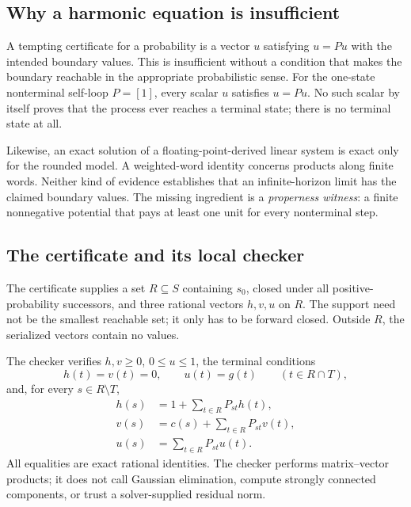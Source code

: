 \subsection{Why a harmonic equation is insufficient}
A tempting certificate for a probability is a vector $u$ satisfying $u=Pu$
with the intended boundary values. This is insufficient without a condition
that makes the boundary reachable in the appropriate probabilistic sense.
For the one-state nonterminal self-loop $P=[1]$, every scalar $u$ satisfies
$u=Pu$. No such scalar by itself proves that the process ever reaches a
terminal state; there is no terminal state at all.

Likewise, an exact solution of a floating-point-derived linear system is exact
only for the rounded model. A weighted-word identity concerns products along
finite words. Neither kind of evidence establishes that an infinite-horizon
limit has the claimed boundary values. The missing ingredient is a
\emph{properness witness}: a finite nonnegative potential that pays at least
one unit for every nonterminal step.

\subsection{The certificate and its local checker}
The certificate supplies a set $R\subseteq S$ containing $s_0$, closed under
all positive-probability successors, and three rational vectors $h,v,u$ on
$R$. The support need not be the smallest reachable set; it only has to be
forward closed. Outside $R$, the serialized vectors contain no values.

The checker verifies $h,v\geq0$, $0\leq u\leq1$, the terminal conditions
\[
 h(t)=v(t)=0,\qquad u(t)=g(t)\qquad(t\in R\cap T),
\]
and, for every $s\in R\setminus T$,
\begin{align}
 h(s)&=1+\sum_{t\in R}P_{st}h(t),\label{eq:h}\\
 v(s)&=c(s)+\sum_{t\in R}P_{st}v(t),\label{eq:v}\\
 u(s)&=\sum_{t\in R}P_{st}u(t).\label{eq:u}
\end{align}
All equalities are exact rational identities. The checker performs
matrix--vector products; it does not call Gaussian elimination, compute
strongly connected components, or trust a solver-supplied residual norm.

